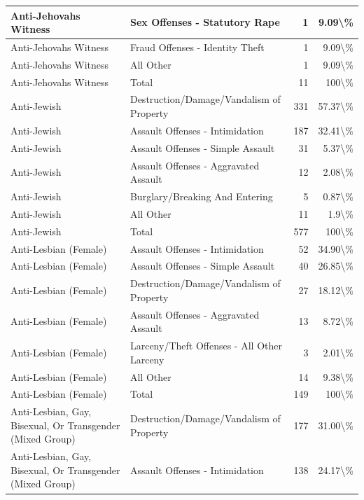 \documentclass[
]{krantz}
\begin{document}
\begin{longtable}[t]{l|l|r|r}
\hline
Anti-Jehovahs Witness & Sex Offenses - Statutory Rape & 1 & 9.09\textbackslash{}\%\\
\hline
Anti-Jehovahs Witness & Fraud Offenses - Identity Theft & 1 & 9.09\textbackslash{}\%\\
\hline
Anti-Jehovahs Witness & All Other & 1 & 9.09\textbackslash{}\%\\
\hline
Anti-Jehovahs Witness & Total & 11 & 100\textbackslash{}\%\\
\hline
Anti-Jewish & Destruction/Damage/Vandalism of Property & 331 & 57.37\textbackslash{}\%\\
\hline
Anti-Jewish & Assault Offenses - Intimidation & 187 & 32.41\textbackslash{}\%\\
\hline
Anti-Jewish & Assault Offenses - Simple Assault & 31 & 5.37\textbackslash{}\%\\
\hline
Anti-Jewish & Assault Offenses - Aggravated Assault & 12 & 2.08\textbackslash{}\%\\
\hline
Anti-Jewish & Burglary/Breaking And Entering & 5 & 0.87\textbackslash{}\%\\
\hline
Anti-Jewish & All Other & 11 & 1.9\textbackslash{}\%\\
\hline
Anti-Jewish & Total & 577 & 100\textbackslash{}\%\\
\hline
Anti-Lesbian (Female) & Assault Offenses - Intimidation & 52 & 34.90\textbackslash{}\%\\
\hline
Anti-Lesbian (Female) & Assault Offenses - Simple Assault & 40 & 26.85\textbackslash{}\%\\
\hline
Anti-Lesbian (Female) & Destruction/Damage/Vandalism of Property & 27 & 18.12\textbackslash{}\%\\
\hline
Anti-Lesbian (Female) & Assault Offenses - Aggravated Assault & 13 & 8.72\textbackslash{}\%\\
\hline
Anti-Lesbian (Female) & Larceny/Theft Offenses - All Other Larceny & 3 & 2.01\textbackslash{}\%\\
\hline
Anti-Lesbian (Female) & All Other & 14 & 9.38\textbackslash{}\%\\
\hline
Anti-Lesbian (Female) & Total & 149 & 100\textbackslash{}\%\\
\hline
Anti-Lesbian, Gay, Bisexual, Or Transgender (Mixed Group) & Destruction/Damage/Vandalism of Property & 177 & 31.00\textbackslash{}\%\\
\hline
Anti-Lesbian, Gay, Bisexual, Or Transgender (Mixed Group) & Assault Offenses - Intimidation & 138 & 24.17\textbackslash{}\%\\

\end{longtable}
\end{document}
